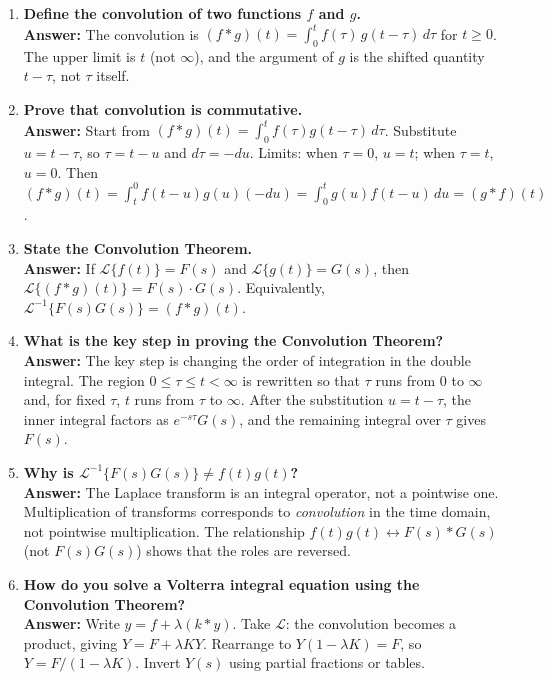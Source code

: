 \documentclass[12pt,a4paper]{article}
\begin{document}
\begin{enumerate}[label=\textbf{Q\arabic*.}, leftmargin=*, itemsep=6pt]

\item \textbf{Define the convolution of two functions $f$ and $g$.} \\
\textbf{Answer:} The convolution is $(f*g)(t) = \int_0^t f(\tau)\,g(t-\tau)\,d\tau$ for $t \geq 0$.
The upper limit is $t$ (not $\infty$), and the argument of $g$ is the shifted
quantity $t-\tau$, not $\tau$ itself.

\item \textbf{Prove that convolution is commutative.} \\
\textbf{Answer:} Start from $(f*g)(t) = \int_0^t f(\tau)g(t-\tau)\,d\tau$.
Substitute $u = t-\tau$, so $\tau = t-u$ and $d\tau = -du$.
Limits: when $\tau=0$, $u=t$; when $\tau=t$, $u=0$.
Then $(f*g)(t) = \int_t^0 f(t-u)g(u)(-du) = \int_0^t g(u)f(t-u)\,du = (g*f)(t)$.

\item \textbf{State the Convolution Theorem.} \\
\textbf{Answer:} If $\mathcal{L}\{f(t)\}=F(s)$ and $\mathcal{L}\{g(t)\}=G(s)$,
then $\mathcal{L}\{(f*g)(t)\} = F(s)\cdot G(s)$.
Equivalently, $\mathcal{L}^{-1}\{F(s)G(s)\} = (f*g)(t)$.

\item \textbf{What is the key step in proving the Convolution Theorem?} \\
\textbf{Answer:} The key step is changing the order of integration in the
double integral. The region $0\leq\tau\leq t<\infty$ is rewritten so that
$\tau$ runs from $0$ to $\infty$ and, for fixed $\tau$, $t$ runs from $\tau$
to $\infty$. After the substitution $u = t-\tau$, the inner integral factors
as $e^{-s\tau}G(s)$, and the remaining integral over $\tau$ gives $F(s)$.

\item \textbf{Why is $\mathcal{L}^{-1}\{F(s)G(s)\} \neq f(t)g(t)$?} \\
\textbf{Answer:} The Laplace transform is an integral operator, not a pointwise
one. Multiplication of transforms corresponds to \emph{convolution} in the
time domain, not pointwise multiplication. The relationship
$f(t)g(t) \longleftrightarrow F(s)*G(s)$ (not $F(s)G(s)$) shows that
the roles are reversed.

\item \textbf{How do you solve a Volterra integral equation using the Convolution Theorem?} \\
\textbf{Answer:} Write $y = f + \lambda(k*y)$. Take $\mathcal{L}$: the
convolution becomes a product, giving $Y = F + \lambda KY$. Rearrange to
$Y(1-\lambda K) = F$, so $Y = F/(1-\lambda K)$. Invert $Y(s)$ using partial
fractions or tables.


\end{enumerate}
\end{document}
